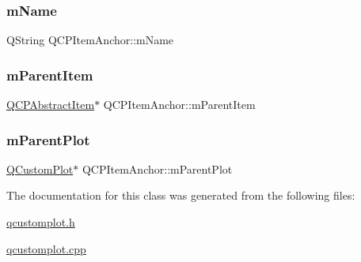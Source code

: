 \subsubsection{\texorpdfstring{m\+Name}{mName}}
{\footnotesize\ttfamily Q\+String Q\+C\+P\+Item\+Anchor\+::m\+Name\hspace{0.3cm}{\ttfamily [protected]}}

\mbox{\label{class_q_c_p_item_anchor_a80fad480ad3bb980446ed6ebc00818ae}} 
\subsubsection{\texorpdfstring{m\+Parent\+Item}{mParentItem}}
{\footnotesize\ttfamily \hyperlink{class_q_c_p_abstract_item}{Q\+C\+P\+Abstract\+Item}$\ast$ Q\+C\+P\+Item\+Anchor\+::m\+Parent\+Item\hspace{0.3cm}{\ttfamily [protected]}}

\mbox{\label{class_q_c_p_item_anchor_a59b968410831ba91a25cc75a77dde6f5}} 
\subsubsection{\texorpdfstring{m\+Parent\+Plot}{mParentPlot}}
{\footnotesize\ttfamily \hyperlink{class_q_custom_plot}{Q\+Custom\+Plot}$\ast$ Q\+C\+P\+Item\+Anchor\+::m\+Parent\+Plot\hspace{0.3cm}{\ttfamily [protected]}}



The documentation for this class was generated from the following files\+:\begin{DoxyCompactItemize}
\item 
\hyperlink{qcustomplot_8h}{qcustomplot.\+h}\item 
\hyperlink{qcustomplot_8cpp}{qcustomplot.\+cpp}\end{DoxyCompactItemize}
